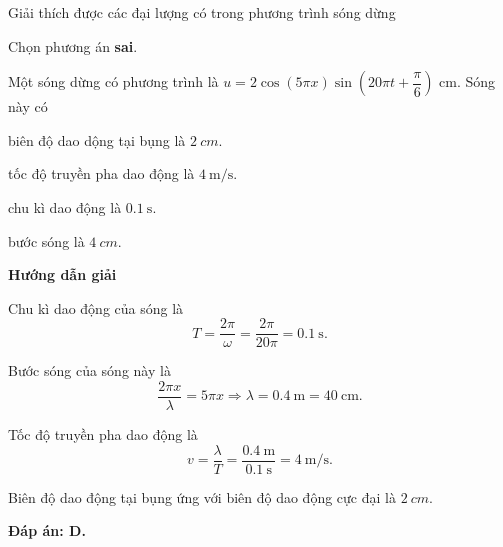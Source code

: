 \begin{dang}{Giải thích được các đại lượng có trong phương trình sóng dừng}
	{Chọn phương án \textbf{sai}.
		
		Một sóng dừng có phương trình là $u=2\cos(5\pi x)\sin\left(20\pi t+\dfrac{\pi}{6}\right)$ cm. Sóng này có
		\begin{mcq}
			\item biên độ dao dộng tại bụng là $\SI{2}{cm}$.
			\item tốc độ truyền pha dao động là $\SI{4}{\meter/\second}$.
			\item chu kì dao động là $\SI{0.1}{\second}$.
			\item bước sóng là $\SI{4}{cm}$.
		\end{mcq}
	}
	{
		\begin{center}
			\textbf{Hướng dẫn giải}
		\end{center}
		
		Chu kì dao động của sóng là
		$$T=\dfrac{2\pi}{\omega}=\dfrac{2\pi}{20\pi}=\SI{0.1}{\second}.$$
		
		Bước sóng của sóng này là
		$$\dfrac{2\pi x}{\lambda}=5\pi x\Rightarrow \lambda=\SI{0.4}{\meter}=40\ \text{cm}.$$
		
		Tốc độ truyền pha dao động là
		$$v=\dfrac{\lambda}{T}=\dfrac{\SI{0.4}{\meter}}{\SI{0,1}{\second}}=\SI{4}{\meter/\second}.$$
		
		Biên độ dao động tại bụng ứng với biên độ dao động cực đại là $\SI{2}{cm}$.
		
		\textbf{Đáp án: D.}
	}
\end{dang}
